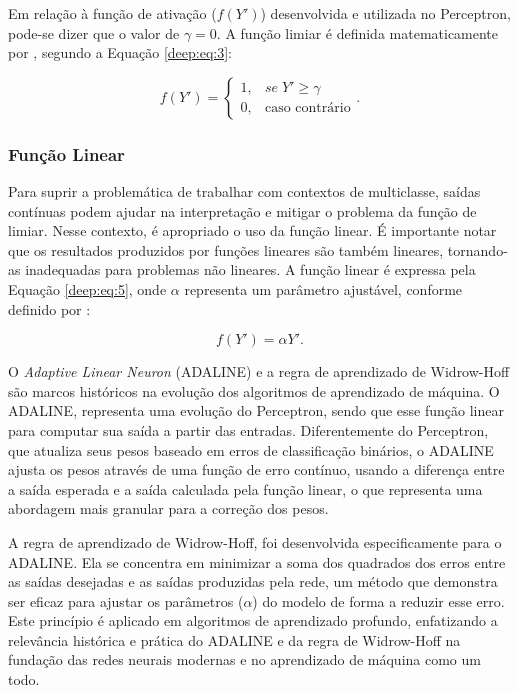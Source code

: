 Em relação à função de ativação ($f(Y')$) desenvolvida e utilizada no Perceptron, pode-se dizer que o valor de $\gamma = 0$. A função limiar é definida matematicamente por \cite{mcculloch1943logical}, segundo a Equação \ref{deep:eq:3}:

\begin{equation}
    \label{deep:eq:3}
    f(Y') = \begin{cases}
     1,& se \; Y' \geq \gamma \\ 
     0,& \text{caso contrário}
    \end{cases}.
\end{equation}


\subsubsection{Função Linear}
\label{deep:linear}
Para suprir a problemática de trabalhar com contextos de multiclasse, saídas contínuas podem ajudar na interpretação e mitigar o problema da função de limiar. Nesse contexto, é apropriado o uso da função linear. É importante notar que os resultados produzidos por funções lineares são também lineares, tornando-as inadequadas para problemas não lineares. A função linear é expressa pela Equação \ref{deep:eq:5}, onde $\alpha$ representa um parâmetro ajustável, conforme definido por \cite{Rosenblatt1958}:

\begin{equation}
\label{deep:eq:5}
f(Y') = \alpha Y'.
\end{equation}

O \textit{Adaptive Linear Neuron} (ADALINE) \citep{Widrow199030YO} e a regra de aprendizado de Widrow-Hoff são marcos históricos na evolução dos algoritmos de aprendizado de máquina. O ADALINE, representa uma evolução do Perceptron, sendo que esse função linear para computar sua saída a partir das entradas. Diferentemente do Perceptron, que atualiza seus pesos baseado em erros de classificação binários, o ADALINE ajusta os pesos através de uma função de erro contínuo, usando a diferença entre a saída esperada e a saída calculada pela função linear, o que representa uma abordagem mais granular para a correção dos pesos.

A regra de aprendizado de Widrow-Hoff, foi desenvolvida especificamente para o ADALINE. Ela se concentra em minimizar a soma dos quadrados dos erros entre as saídas desejadas e as saídas produzidas pela rede, um método que demonstra ser eficaz para ajustar os parâmetros ($\alpha$) do modelo de forma a reduzir esse erro. Este princípio é aplicado em algoritmos de aprendizado profundo, enfatizando a relevância histórica e prática do ADALINE e da regra de Widrow-Hoff na fundação das redes neurais modernas e no aprendizado de máquina como um todo.

